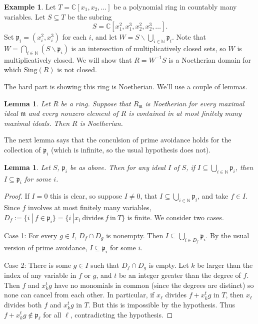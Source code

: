 \documentclass{amsart}[12pt]
\newcommand{\C}{\mathbb{C}}
\newcommand{\N}{\mathbb{N}}
\newcommand{\fp}{{\mathfrak p}}
\newcommand{\fm}{{\mathfrak m}}
\numberwithin{equation}{section}
\theoremstyle{plain} %
\newtheorem{lem}[equation]{Lemma}
\theoremstyle{definition}
\newtheorem{ex}[equation]{Example}
\theoremstyle{remark}
\begin{document}
\begin{ex} Let $T=\C[x_1,x_2,\dots]$ be a polynomial ring in countably many variables. Let $S\subseteq T$ be the subring
\[ S = \C[x_1^2,x_1^3,x_2^2,x_2^3,\dots].\]
Set $\fp_i=(x_i^2,x_i^3)$ for each $i$, and let $W= S \smallsetminus \bigcup_{i\in \N} \fp_i$.
Note that $W = \bigcap_{i\in \N} (S\smallsetminus \fp_i)$ is an intersection of multiplicatively closed sets, so $W$ is multiplicatively closed. We will show that $R=W^{-1}S$ is a Noetherian domain for which $\mathrm{Sing}(R)$ is not closed.

The hard part is showing this ring is Noetherian. We'll use a couple of lemmas.

\begin{lem} Let $R$ be a ring. Suppose that $R_\fm$ is Noetherian for every maximal ideal $\fm$ and every nonzero element of $R$ is contained in at most finitely many maximal ideals. Then $R$ is Noetherian.
\end{lem}

The next lemma says that the conculsion of prime avoidance holds for the collection of $\fp_i$ (which is infinite, so the usual hypothesis does not).
\begin{lem} Let $S$, $\fp_i$ be as above. Then for any ideal $I$ of $S$, if $I\subseteq \bigcup_{i\in \N} \fp_i$, then $I\subseteq \fp_i$ for some $i$.
\end{lem}
\begin{proof} If $I=0$ this is clear, so suppose $I\neq 0$, that $I\subseteq \bigcup_{i\in \N} \fp_i$, and take $f\in I$. Since $f$ involves at most finitely many variables, $D_f:=\{i \ | \ f\in \fp_i\}= \{ i \ | x_i \ \text{divides} \ f \ \text{in} \ T\}$ is finite. We consider two cases. 

Case 1: For every $g\in I$, $D_f \cap D_g$ is nonempty. Then $I \subseteq \bigcup_{i\in D_f} \fp_i$. By the usual version of prime avoidance, $I \subseteq \fp_i$ for some $i$.

Case 2: There is some $g\in I$ such that $D_f \cap D_g$ is empty. Let $k$ be larger than the index of any variable in $f$ or $g$, and $t$ be an integer greater than the degree of $f$. Then $f$ and $x_k^t g$ have no monomials in common (since the degrees are distinct) so none can cancel from each other. In particular, if $x_\ell$ divides $f+x_k^t g$ in $T$, then $x_\ell$  divides both $f$ and $x_k^t g$ in $T$. But this is impossible by the hypothesis. Thus $f+x_k^t g\notin \fp_\ell$ for all $\ell$, contradicting the hypothesis.


\end{proof}


\end{ex}
\end{document}
